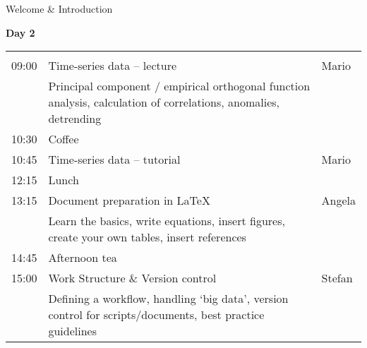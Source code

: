 \begin{frame}{\insertsectionnumber{ |} Welcome \& Introduction}

\textbf{Day 2} \\
\vspace*{0.75cm}\begin{tabular}{p{0.75cm}|p{7.5cm}|p{1.75cm}}
\hline\\09:00 & Time-series data -- lecture & Mario \\
& \small{Principal component / empirical orthogonal function analysis, calculation of correlations, anomalies, detrending} & \\
10:30 & Coffee &  \\
10:45 & Time-series data -- tutorial & Mario \\
12:15 & Lunch & \\
13:15 & Document preparation in \LaTeX & Angela \\
& \small{Learn the basics, write equations, insert figures, create your own tables, insert references} & \\
14:45 & Afternoon tea &  \\
15:00 & Work Structure \& Version control & Stefan \\
& \small{Defining a workflow, handling `big data', version control for scripts/documents, best practice guidelines} & \\
\hline
\end{tabular}


\end{frame}


